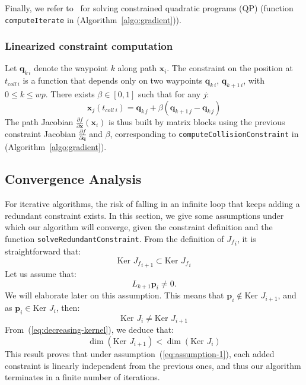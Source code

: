 \documentclass{tADR2e}
\newcommand\p{\mathbf{p}}
\newcommand\pii{\mathbf{p_{i,i+1}}}
\newcommand\conf{\mathbf{q}}
\newcommand\xx{\mathbf{x}} %
\newcommand\tcolli{t_{coll\ i}}
\newcommand\Jf{{J_f}}
\newcommand\kernel{\mbox{Ker }}
\begin{document}
\vspace{0.4cm}

Finally, we refer to~\cite{nocedal2006numerical} for solving constrained quadratic 
programs (QP) (function \texttt{computeIterate} in 
(Algorithm~\ref{algo:gradient})).


\vspace{0.2cm}

\subsubsection{Linearized constraint computation} \label{sec:lin_constr_compt}

Let $\conf_{k\,i}$ denote the waypoint $k$ along path $\xx_i$.
The constraint on the position at $t_{coll\,i}$ is a function that depends only
on two waypoints $\conf_{k\,i}$, $\conf_{k+1\,i}$, with $0\leq k\leq wp$.
There exists $\beta\in[0,1]$ such that for any $j$:
$$
\xx_j (\tcolli) = \conf_{k\,j} + \beta (\conf_{k+1\,j} - \conf_{k\,j})
$$
The path Jacobian $\frac{\partial f}{\partial \xx}(\xx_i)$ is thus built by matrix 
blocks using the previous constraint Jacobian $\frac{\partial f}{\partial \conf}$ 
and $\beta$, corresponding to \texttt{computeCollisionConstraint} in 
(Algorithm~\ref{algo:gradient}).


\subsection{Convergence Analysis}
For iterative algorithms, the risk of falling in an infinite loop 
that keeps adding a redundant constraint exists.
In this section, we give some assumptions under which our 
algorithm will converge, given the constraint definition and the 
function \texttt{solveRedundantConstraint}.
From the definition of $\Jf_{i}$, it is straightforward that:
\begin{equation}\label{eq:decreasing-kernel}
\kernel \Jf_{i+1} \subset \kernel \Jf_{i}
\end{equation}
Let us assume that:
\begin{equation}\label{eq:assumption-1}
L_{k+1}\p_i \not= 0.
\end{equation}
We will elaborate later on this assumption. This means that $\p_{i}\notin\kernel J_{i+1}$, and as $\p_{i}\in\kernel J_{i}$, then:
$$
\kernel J_i \not= \kernel J_{i+1}
$$
From~(\ref{eq:decreasing-kernel}), we deduce that:
$$
\dim (\kernel J_{i+1}) < \dim (\kernel J_i)
$$
This result proves that under assumption~(\ref{eq:assumption-1}), each added constraint 
is linearly independent from the 
previous ones, and thus our algorithm terminates in a finite number of iterations.
\end{document}

